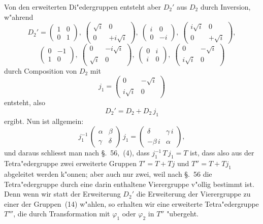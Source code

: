 \documentclass[12pt,a4paper]{article}
\theoremstyle{plain}
\theoremstyle{definition}
\theoremstyle{remark}
\begin{document}
Von den erweiterten Di"edergruppen entsteht aber $D_{2}'$ aus $D_{2}$ durch Inversion, w"ahrend
\[
D_{2}' = \begin{pmatrix} 1 & 0 \\ 0 & 1 \end{pmatrix},\;
\begin{pmatrix} \sqrt{i} & 0 \\ 0 & +i\sqrt{i} \end{pmatrix},\;
\begin{pmatrix} i & 0 \\ 0 & -i \end{pmatrix},\;
\begin{pmatrix} i\sqrt{i} & 0 \\ 0 & +\sqrt{i} \end{pmatrix},
\]
\[
\begin{pmatrix} 0 & -1 \\ 1 & 0 \end{pmatrix},\;
\begin{pmatrix} 0 & -i\sqrt{i} \\ \sqrt{i} & 0 \end{pmatrix},\;
\begin{pmatrix} 0 & i \\ i & 0 \end{pmatrix},\;
\begin{pmatrix} 0 & -\sqrt{i} \\ i\sqrt{i} & 0 \end{pmatrix}
\]
durch Composition von $D_{2}$ mit
\[
j_{1} = \begin{pmatrix} 0 & -\sqrt{i} \\ i\sqrt{i} & 0 \end{pmatrix}
\]
entsteht, also
\[
D_{2}' = D_{2} + D_{2}\,j_{1}
\]
ergibt. Nun ist allgemein:
\[
j_{1}^{-1}\,\begin{pmatrix} \alpha & \beta \\ \gamma & \delta \end{pmatrix}\,j_{1} =
\begin{pmatrix} \delta & \gamma\,i \\ -\beta\,i & \alpha \end{pmatrix},
\]
und daraus schliesst man nach \S.~56,~(4), dass $j_{1}^{-1}\,T\,j_{1} = T$ ist, dass also aus der Tetra"edergruppe zwei erweiterte Gruppen $T' = T + Tj$ und $T'' = T + Tj_{1}$ abgeleitet werden k"onnen; aber auch nur zwei, weil nach \S.~56 die Tetra"edergruppe durch eine darin enthaltene Vierergruppe v"ollig bestimmt ist. Denn wenn wir statt der Erweiterung $D_{2}'$ die Erweiterung der Vierergruppe zu einer der Gruppen~(14) w"ahlen, so erhalten wir eine erweiterte Tetra"edergruppe $T'''$, die durch Transformation mit $\varphi_{1}$ oder $\varphi_{2}$ in $T''$ "ubergeht.
\end{document}

